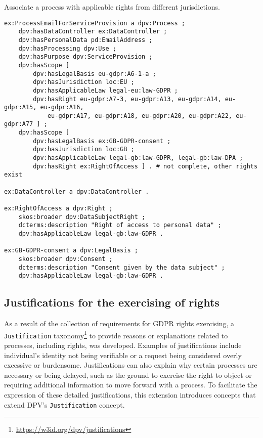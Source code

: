 \documentclass{IOS-Book-Article}     %
\begin{document}
\begin{listing}
\caption{Associate a process with applicable rights from different jurisdictions.}
\label{lst:rights}
\begin{verbatim}
ex:ProcessEmailForServiceProvision a dpv:Process ;
    dpv:hasDataController ex:DataController ;
    dpv:hasPersonalData pd:EmailAddress ;
    dpv:hasProcessing dpv:Use ;
    dpv:hasPurpose dpv:ServiceProvision ;
    dpv:hasScope [
        dpv:hasLegalBasis eu-gdpr:A6-1-a ;
        dpv:hasJurisdiction loc:EU ;
        dpv:hasApplicableLaw legal-eu:law-GDPR ;
        dpv:hasRight eu-gdpr:A7-3, eu-gdpr:A13, eu-gdpr:A14, eu-gdpr:A15, eu-gdpr:A16, 
            eu-gdpr:A17, eu-gdpr:A18, eu-gdpr:A20, eu-gdpr:A22, eu-gdpr:A77 ] ;
    dpv:hasScope [
        dpv:hasLegalBasis ex:GB-GDPR-consent ;
        dpv:hasJurisdiction loc:GB ;
        dpv:hasApplicableLaw legal-gb:law-GDPR, legal-gb:law-DPA ;
        dpv:hasRight ex:RightOfAccess ] . # not complete, other rights exist

ex:DataController a dpv:DataController .

ex:RightOfAccess a dpv:Right ;
    skos:broader dpv:DataSubjectRight ;
    dcterms:description "Right of access to personal data" ;
    dpv:hasApplicableLaw legal-gb:law-GDPR .

ex:GB-GDPR-consent a dpv:LegalBasis ;
    skos:broader dpv:Consent ;
    dcterms:description "Consent given by the data subject" ;
    dpv:hasApplicableLaw legal-gb:law-GDPR .
\end{verbatim}
\end{listing}

\subsection{Justifications for the exercising of rights}
\label{sec:justifications}

As a result of the collection of requirements for GDPR rights exercising, a \texttt{Justification} taxonomy\footnote{\url{https://w3id.org/dpv/justifications}} to provide reasons or explanations related to processes, including rights, was developed.
Examples of justifications include individual's identity not being verifiable or a request being considered overly excessive or burdensome.
Justifications can also explain why certain processes are necessary or being delayed, such as the ground to exercise the right to object or requiring additional information to move forward with a process.
To facilitate the expression of these detailed justifications, this extension introduces concepts that extend DPV's \texttt{Justification} concept.
\end{document}
